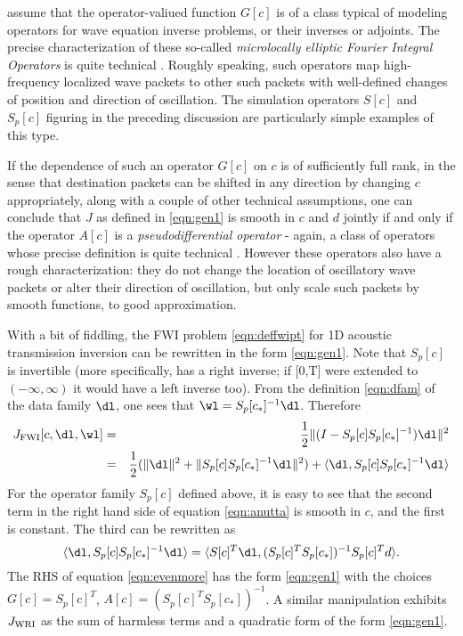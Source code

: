 \cite{StolkSymes:03} assume that the
operator-valiued function $G[c]$ is of a class typical of modeling
operators for wave equation inverse problems, or their inverses or
adjoints. The precise characterization of these so-called {\em microlocally elliptic Fourier Integral
Operators} is quite technical \cite[]{Dui:95}. Roughly speaking, such operators map high-frequency localized wave packets to other
such packets with well-defined changes of position and direction of
oscillation. The simulation operators $S[c]$ and $S_p[c]$ figuring in the preceding
discussion are particularly simple examples of this type.

If the dependence of such an operator $G[c]$ on $c$ is of sufficiently full rank, in
the sense that destination packets can be shifted in any direction by
changing $c$ appropriately, along with a couple of other technical
assumptions, one can conclude that $J$ as defined in \ref{eqn:gen1} is
smooth in $c$ and $d$ jointly if and only if the operator $A[c]$ is a 
{\em pseudodifferential operator} - again, a class of operators whose
precise definition is quite technical \cite[]{Dui:95,Tay:81}. However these operators also
have a rough characterization: they do not change the location of
oscillatory wave packets
or alter their direction of oscillation, but only scale such packets
by smooth functions, to good approximation. 

With a bit of fiddling, the FWI problem \ref{eqn:deffwipt} for 1D 
acoustic transmission inversion can be rewritten in the form \ref{eqn:gen1}. Note
that $S_p[c]$ is invertible (more specifically, has a right inverse; if [0,T] were
extended to $(-\infty,\infty)$ it would have a left inverse too). From
the definition \ref{eqn:dfam} of the data family $\dl$, one sees that
$\wl = S_p[c_*]^{-1}\dl$. Therefore
\begin{eqnarray}
  \label{eqn:anutta}
  J_{\rm FWI}[c,\dl,\wl] &=&
                             \frac{1}{2}\|(I-S_p[c]S_p[c_*]^{-1})\dl\|^2 \nonumber\\
 & =&\frac{1}{2}(\|\dl\|^2 + \|S_p[c]S_p[c_*]^{-1}\dl\|^2) + \langle \dl,
  S_p[c]S_p[c_*]^{-1}\dl\rangle
\end{eqnarray}
For the operator family $S_p[c]$ defined above, it is easy to see that
the second term in the right hand side of equation \ref{eqn:anutta} is
smooth in $c$, and the first is constant. The third can be rewritten
as
\begin{equation}
  \label{eqn:evenmore}
  \langle \dl,  S_p[c]S_p[c_*]^{-1}\dl\rangle = \langle S[c]^T\dl, 
  (S_p[c]^T S_p[c_*])^{-1}S_p[c]^Td\rangle.
\end{equation}
The RHS of equation \ref{eqn:evenmore} has the form \ref{eqn:gen1} with the choices $G[c]=S_p[c]^T$,
$A[c]=(S_p[c]^T S_p[c_*])^{-1}$. A similar manipulation exhibits
$J_{\rm WRI}$ as the sum of harmless terms and a quadratic form of the
form \ref{eqn:gen1}.

